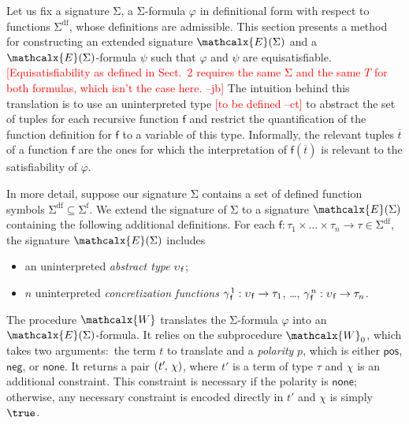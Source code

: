 \documentclass[runningheads,a4paper]{llncs}
\newcommand{\con}[1]{\mathsf{#1}}
\renewcommand\vec[1]{\overline{#1}}
\let\oldSigma=\Sigma
\def\Sigma{\mathrm{\oldSigma}}
\newcommand{\conv}{\mathcalx{W}}
\newcommand{\sfuns}[1]{#1^\mathrm{f}}
\newcommand{\sfundefs}[1]{#1^\mathrm{df}}
\newcommand{\pnone}{\con{none}}
\newcommand{\ptrue}{\con{pos}}
\newcommand{\pfalse}{\con{neg}}
\newcommand\concret{\gamma} %
\newcommand{\farg}[1]{\concret_{\vthinspace#1}}
\newcommand{\fargx}[2]{\concret^{\vthinspace#2}_{\vthinspace#1}}
\newcommand{\fargsort}[1]{\upsilon_{\vthinspace#1}}
\newcommand{\extendsig}[1]{\mathcalx{E}( #1 )}
\newcommand{\rem}[1]{\textcolor{red}{[#1]}}
\newcommand{\jb}[1]{\rem{#1 --jb}}
\newcommand{\ct}[1]{\rem{#1 --ct}}
\newcommand{\negvthinspace}{\kern-0.083333em}
\newcommand{\vthinspace}{\kern+0.083333em}
\begin{document}
Let us fix a signature $\Sigma$, a $\Sigma$-formula
$\varphi$ in definitional form with respect to functions $\sfundefs{\Sigma}$,
whose definitions are admissible.
This section presents a method for constructing an extended signature
$\extendsig{ \Sigma }$ and a $\extendsig{ \Sigma }$-formula $\psi$ such that
$\varphi$ and $\psi$ are equisatisfiable.
\jb{Equisatisfiability as defined in Sect.\ 2 requires the same $\Sigma$ and
the same $T$ for both formulas, which isn't the case here.}
The intuition behind this translation
is to use an uninterpreted type \ct{to be defined} to abstract the set of
 tuples for each recursive function $\con{f}$ and restrict the
quantification of the function definition for $\con{f}$ to a variable of this
type. Informally, the relevant tuples $\vec t$ of a function $\con{f}$ are the
ones for which the interpretation of $\con{f}( \vec t )$ is relevant to the
satisfiability of $\varphi$.

In more detail, 
suppose our signature $\Sigma$ contains a set of defined function symbols $\sfundefs{\Sigma} \subseteq \sfuns{\Sigma}$.
We extend the signature of $\Sigma$ to a signature $\extendsig{\Sigma}$ containing the following additional definitions.
For each $\con{f} : \tau_1 \times \ldots \times \tau_n \rightarrow \tau \in \sfundefs{\Sigma}$,
the signature $\extendsig{\Sigma}$ includes
\begin{itemize}
\item an uninterpreted \emph{abstract type} $\fargsort{\con{f}}$;
\item $n$ uninterpreted \emph{concretization functions} $\fargx{\con{f}}{1} : \fargsort{\con{f}} \rightarrow \tau_1$, \ldots, $\fargx{\con{f}}{n} : \fargsort{\con{f}} \rightarrow \tau_n$.
\end{itemize}

The procedure $\conv$ translates the $\Sigma$-formula
$\varphi$ into an $\extendsig{\Sigma}$-formula. It relies
on the subprocedure $\conv_0$, which takes two arguments:\ the term $t$
to translate and a \emph{polarity} $p$, which is either $\ptrue$, $\pfalse$, or
$\pnone$. It returns a pair $( t'\negvthinspace,\, \chi )$, where $t'$ is a term of
type $\tau$ and $\chi$ is an additional constraint.
This constraint is necessary if the polarity is $\pnone$; otherwise, any necessary
constraint is encoded directly in $t'$ and $\chi$ is simply $\true$.
\end{document}

